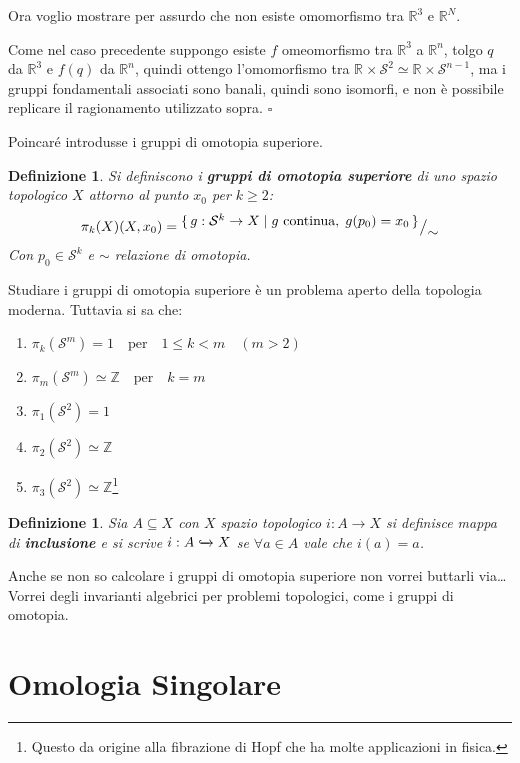 \documentclass[10pt, twoside=false, x11names]{scrbook}
\newtheorem{definition}[theorem]{Definizione}
\newenvironment{proof}{{\textbf{Dimostrazione}:}}{\hfill $\square$}
\newcommand{\Z}{\mathbb{Z}}
\newcommand{\RN}[1][]{\mathbb{R}^#1}
\newcommand{\Sph}[1][]{\mathcal{S}^#1}
\newcommand{\incl}{\xhookrightarrow{}}
\newcommand*\quot[2]{{^{\textstyle #1}\big/_{\textstyle #2}}}
\begin{document}
Ora voglio mostrare per assurdo che non esiste omomorfismo tra $ \RN{3} $ e $ \RN{N} $.

\begin{proof}
  Come nel caso precedente suppongo esiste $ f $ omeomorfismo tra $ \RN{3} $ a $ \RN{n} $,
  tolgo $ q $ da $ \RN{3} $ e $ f(q) $ da $ \RN{n} $, quindi ottengo
  l'omomorfismo tra $ \RN{} \times \Sph{2} \simeq \RN{} \times \Sph{n-1} $, ma i gruppi fondamentali
  associati sono banali, quindi sono isomorfi, e non è possibile replicare il ragionamento utilizzato sopra.
\end{proof}

Poincaré introdusse i gruppi di omotopia superiore.

\begin{definition}
  Si definiscono i \textbf{gruppi di omotopia superiore} di uno spazio topologico $ X $
  attorno al punto $ x_0 $ per $ k \geq 2 $:
  \[
    \pi_k(X) (X, x_0) = \quot{\set{ g: \Sph{k} \to X | g \text{ continua}, \; g(p_0) = x_0}}{\sim}
  \]
  Con $ p_0 \in \Sph{k} $ e $ \sim $ relazione di omotopia.
\end{definition}
Studiare i gruppi di omotopia superiore è un problema aperto della topologia moderna.
Tuttavia si sa che:
\begin{enumerate}
\item $ \pi_k(\Sph{m}) = 1 \quad \text{per} \quad 1 \leq k < m \quad (m > 2)$
\item $ \pi_m(\Sph{m}) \simeq \Z \quad \text{per} \quad k = m $
\item $ \pi_1(\Sph{2}) = 1 $
\item $ \pi_2(\Sph{2}) \simeq \Z $
\item $ \pi_3(\Sph{2}) \simeq \Z $\footnote{Questo da origine alla fibrazione di Hopf che ha molte applicazioni in fisica.}
\end{enumerate}

\begin{definition}
  Sia $ A \subseteq X $ con $ X $ spazio topologico $ i: A \to X $ si definisce mappa di \textbf{inclusione}
  e si scrive $ i: A \incl X $ se $ \forall a \in A $ vale che $ i(a) = a $.
\end{definition}


Anche se non so calcolare i gruppi di omotopia superiore non vorrei buttarli via\dots
Vorrei degli invarianti algebrici per problemi topologici, come i gruppi di omotopia.

\chapter{Omologia Singolare}
\end{document}
